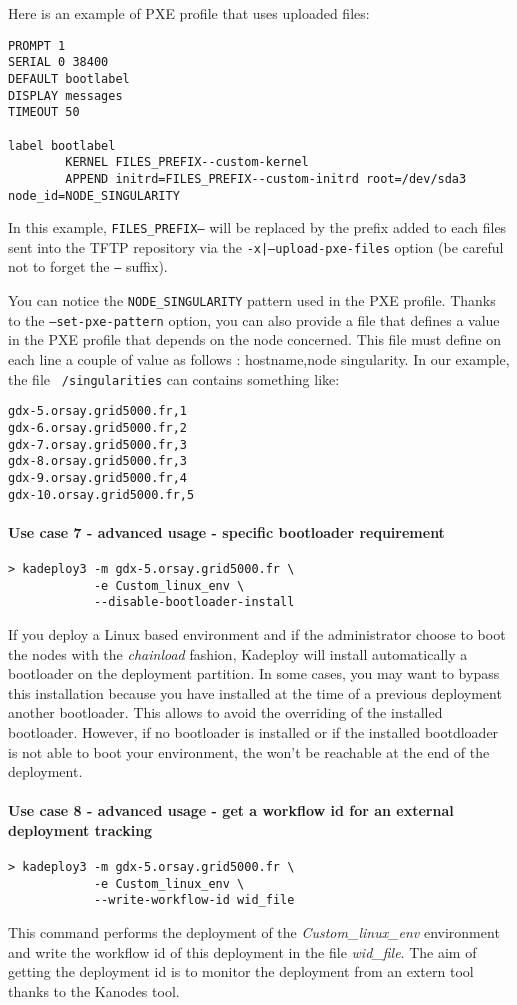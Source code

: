 \documentclass[a4wide,10pt,oneside]{book}
\begin{document}
Here is an example of PXE profile that uses uploaded files:
\begin{verbatim}
PROMPT 1
SERIAL 0 38400
DEFAULT bootlabel
DISPLAY messages
TIMEOUT 50

label bootlabel
        KERNEL FILES_PREFIX--custom-kernel
        APPEND initrd=FILES_PREFIX--custom-initrd root=/dev/sda3 node_id=NODE_SINGULARITY
\end{verbatim}

In this example, \texttt{FILES\_PREFIX--} will be replaced by the prefix added to each files sent into the TFTP repository via the \texttt{-x|--upload-pxe-files} option (be careful not to forget the \texttt{--} suffix).

You can notice the \texttt{NODE\_SINGULARITY} pattern used in the PXE profile. Thanks to the \texttt{--set-pxe-pattern} option, you can also provide a file that defines a value in the PXE profile that depends on the node concerned. This file must define on each line a couple of value as follows : hostname,node singularity. In our example, the file \texttt{~/singularities} can contains something like:
\begin{verbatim}
gdx-5.orsay.grid5000.fr,1
gdx-6.orsay.grid5000.fr,2
gdx-7.orsay.grid5000.fr,3
gdx-8.orsay.grid5000.fr,3
gdx-9.orsay.grid5000.fr,4
gdx-10.orsay.grid5000.fr,5
\end{verbatim}

\paragraph{Use case 7 - advanced usage - specific bootloader requirement}
\begin{verbatim}
> kadeploy3 -m gdx-5.orsay.grid5000.fr \
            -e Custom_linux_env \
            --disable-bootloader-install
\end{verbatim}
If you deploy a Linux based environment and if the administrator choose to boot the nodes with the \textit{chainload} fashion, Kadeploy will install automatically a bootloader on the deployment partition. In some cases, you may want to bypass this installation because you have installed at the time of a previous deployment another bootloader. This allows to avoid the overriding of the installed bootloader. However, if no bootloader is installed or if the installed bootdloader is not able to boot your environment, the won't be reachable at the end of the deployment.

\paragraph{Use case 8 - advanced usage - get a workflow id for an external deployment tracking}\label{par:usecase-wid}
\begin{verbatim}
> kadeploy3 -m gdx-5.orsay.grid5000.fr \
            -e Custom_linux_env \
            --write-workflow-id wid_file
\end{verbatim}
This command performs the deployment of the \textit{Custom\_linux\_env} environment and write the workflow id of this deployment in the file \textit{wid\_file}. The aim of getting the deployment id is to monitor the deployment from an extern tool thanks to the Kanodes tool.
\end{document}
